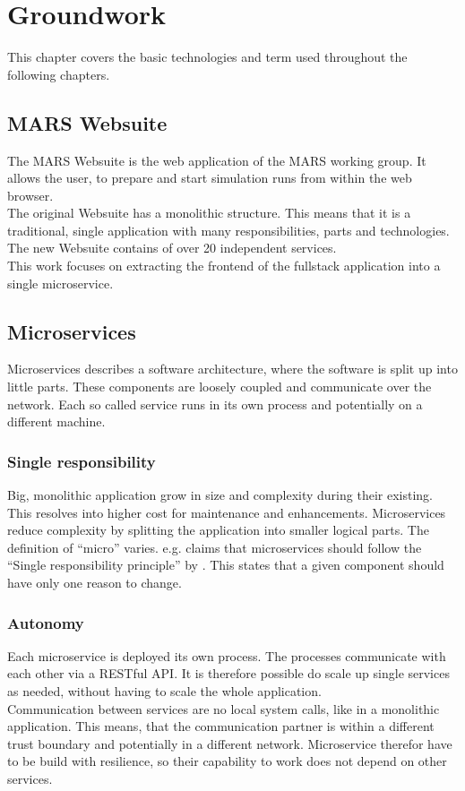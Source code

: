 
\chapter{Groundwork}
This chapter covers the basic technologies and term used throughout the following chapters.



\section{MARS Websuite}
The MARS Websuite is the web application of the MARS working group. It allows the user, to prepare and start simulation runs from within the web browser.\\
The original Websuite has a monolithic structure. This means that it is a traditional, single application with many responsibilities, parts and technologies. The new Websuite contains of over 20 independent services.\\
This work focuses on extracting the frontend of the fullstack application into a single microservice.



\section{Microservices}
\label{sec:microservices}
Microservices describes a software architecture, where the software is split up into little parts. These components are loosely coupled and communicate over the network. Each so called service runs in its own process and potentially on a different machine.


\subsection{Single responsibility}
Big, monolithic application grow in size and complexity during their existing. This resolves into higher cost for maintenance and enhancements. Microservices reduce complexity by splitting the application into smaller logical parts. The definition of \enquote{micro} varies. \cite{newman2015building} e.g. claims that microservices should follow the \enquote{Single responsibility principle} by \cite{martin2003agile}. This states that a given component should have only one reason to change.


\subsection{Autonomy}
Each microservice is deployed its own process. The processes communicate with each other via a RESTful API. It is therefore possible do scale up single services as needed, without having to scale the whole application.\\
Communication between services are no local system calls, like in a monolithic application. This means, that the communication partner is within a different trust boundary and potentially in a different network. Microservice therefor have to be build with resilience, so their capability to work does not depend on other services.


